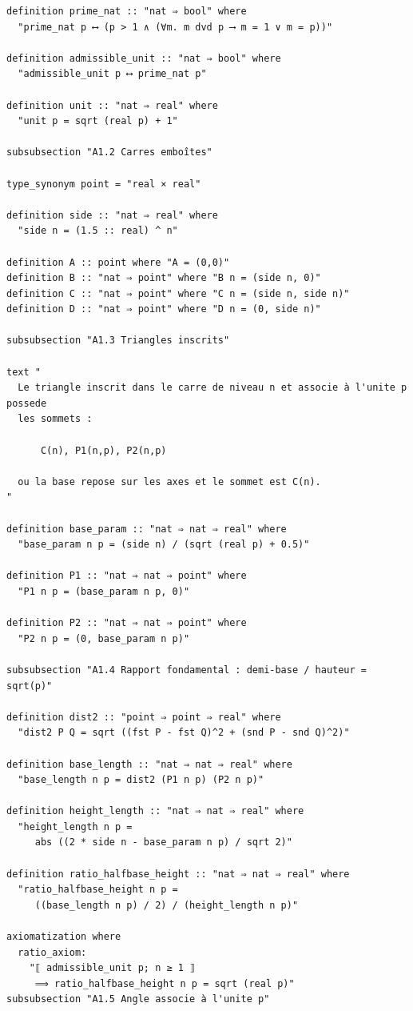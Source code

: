 \documentclass[12pt,a4paper]{article}
\begin{document}
\begin{lstlisting}[style=isabellegray]
definition prime_nat :: "nat ⇒ bool" where
  "prime_nat p ⟷ (p > 1 ∧ (∀m. m dvd p ⟶ m = 1 ∨ m = p))"

definition admissible_unit :: "nat ⇒ bool" where
  "admissible_unit p ⟷ prime_nat p"

definition unit :: "nat ⇒ real" where
  "unit p = sqrt (real p) + 1"

subsubsection "A1.2 Carres emboîtes"

type_synonym point = "real × real"

definition side :: "nat ⇒ real" where
  "side n = (1.5 :: real) ^ n"

definition A :: point where "A = (0,0)"
definition B :: "nat ⇒ point" where "B n = (side n, 0)"
definition C :: "nat ⇒ point" where "C n = (side n, side n)"
definition D :: "nat ⇒ point" where "D n = (0, side n)"

subsubsection "A1.3 Triangles inscrits"

text "
  Le triangle inscrit dans le carre de niveau n et associe à l'unite p possede
  les sommets :

      C(n), P1(n,p), P2(n,p)

  ou la base repose sur les axes et le sommet est C(n).
"

definition base_param :: "nat ⇒ nat ⇒ real" where
  "base_param n p = (side n) / (sqrt (real p) + 0.5)"

definition P1 :: "nat ⇒ nat ⇒ point" where
  "P1 n p = (base_param n p, 0)"

definition P2 :: "nat ⇒ nat ⇒ point" where
  "P2 n p = (0, base_param n p)"

subsubsection "A1.4 Rapport fondamental : demi-base / hauteur = sqrt(p)"

definition dist2 :: "point ⇒ point ⇒ real" where
  "dist2 P Q = sqrt ((fst P - fst Q)^2 + (snd P - snd Q)^2)"

definition base_length :: "nat ⇒ nat ⇒ real" where
  "base_length n p = dist2 (P1 n p) (P2 n p)"

definition height_length :: "nat ⇒ nat ⇒ real" where
  "height_length n p =
     abs ((2 * side n - base_param n p) / sqrt 2)"

definition ratio_halfbase_height :: "nat ⇒ nat ⇒ real" where
  "ratio_halfbase_height n p =
     ((base_length n p) / 2) / (height_length n p)"

axiomatization where
  ratio_axiom:
    "⟦ admissible_unit p; n ≥ 1 ⟧
     ⟹ ratio_halfbase_height n p = sqrt (real p)"
subsubsection "A1.5 Angle associe à l'unite p"


\end{lstlisting}
\end{document}
